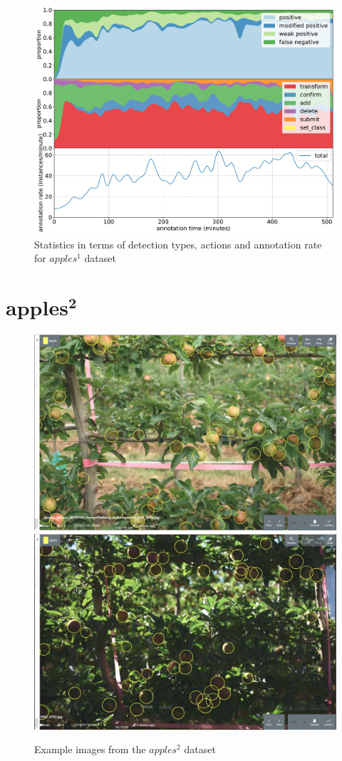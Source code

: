 \begin{figure}[!h]
\centering
\includegraphics[width=1.0\linewidth]{charts/action_annotations/apples1.pdf}
\caption{Statistics in terms of detection types, actions and annotation rate for $apples^1$ dataset}
\label{fig:apples1_annotation}
\end{figure}

\pagebreak
\section{$\mathbf{apples^2}$}
\label{sec:apples2_details}


\begin{figure}[!h]
  \includegraphics[width=0.475\linewidth]{figures/annotation/screenshots/apples2.png}
  \hfill
  \includegraphics[width=0.475\linewidth]{figures/annotation/screenshots/apples2_dark.png}
\caption{Example images from the $apples^2$ dataset}
\label{fig:apples2_dataset}  
\end{figure}

